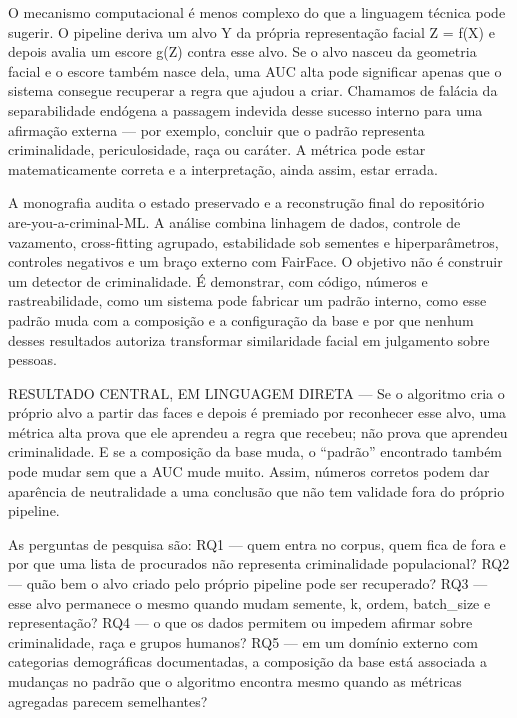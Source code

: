 O mecanismo computacional é menos complexo do que a linguagem técnica pode sugerir. O pipeline deriva um alvo Y da própria representação facial Z = f(X) e depois avalia um escore g(Z) contra esse alvo. Se o alvo nasceu da geometria facial e o escore também nasce dela, uma AUC alta pode significar apenas que o sistema consegue recuperar a regra que ajudou a criar. Chamamos de falácia da separabilidade endógena a passagem indevida desse sucesso interno para uma afirmação externa --- por exemplo, concluir que o padrão representa criminalidade, periculosidade, raça ou caráter. A métrica pode estar matematicamente correta e a interpretação, ainda assim, estar errada.

A monografia audita o estado preservado e a reconstrução final do repositório are-you-a-criminal-ML. A análise combina linhagem de dados, controle de vazamento, cross-fitting agrupado, estabilidade sob sementes e hiperparâmetros, controles negativos e um braço externo com FairFace. O objetivo não é construir um detector de criminalidade. É demonstrar, com código, números e rastreabilidade, como um sistema pode fabricar um padrão interno, como esse padrão muda com a composição e a configuração da base e por que nenhum desses resultados autoriza transformar similaridade facial em julgamento sobre pessoas.

\begin{boxtext}RESULTADO CENTRAL, EM LINGUAGEM DIRETA --- Se o algoritmo cria o próprio alvo a partir das faces e depois é premiado por reconhecer esse alvo, uma métrica alta prova que ele aprendeu a regra que recebeu; não prova que aprendeu criminalidade. E se a composição da base muda, o ``padrão'' encontrado também pode mudar sem que a AUC mude muito. Assim, números corretos podem dar aparência de neutralidade a uma conclusão que não tem validade fora do próprio pipeline.\end{boxtext}

As perguntas de pesquisa são: RQ1 --- quem entra no corpus, quem fica de fora e por que uma lista de procurados não representa criminalidade populacional? RQ2 --- quão bem o alvo criado pelo próprio pipeline pode ser recuperado? RQ3 --- esse alvo permanece o mesmo quando mudam semente, k, ordem, batch\_size e representação? RQ4 --- o que os dados permitem ou impedem afirmar sobre criminalidade, raça e grupos humanos? RQ5 --- em um domínio externo com categorias demográficas documentadas, a composição da base está associada a mudanças no padrão que o algoritmo encontra mesmo quando as métricas agregadas parecem semelhantes?

